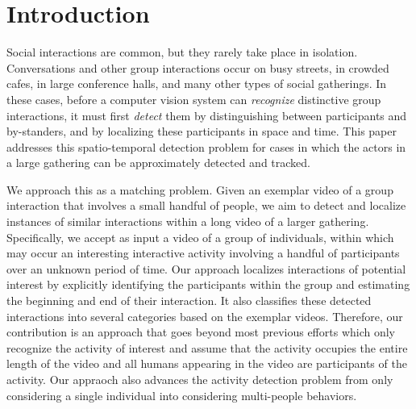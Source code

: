 \section{Introduction}

Social interactions are common, but they rarely take place in isolation. Conversations and other group interactions occur on busy streets, in crowded cafes, in large conference halls, and many other types of social gatherings. In these cases, before a computer vision system can \emph{recognize} distinctive group interactions, it must first \emph{detect} them by distinguishing between participants and by-standers, and by localizing these participants in space and time. This paper addresses this spatio-temporal detection problem for cases in which the actors in a large gathering can be approximately detected and tracked.

We approach this as a matching problem. Given an exemplar video of a group interaction that involves a small handful of people, we aim to detect and localize instances of similar interactions within a long video of a larger gathering. 
Specifically, we accept as input a video of a group of individuals, within which may occur an interesting interactive activity involving a handful of participants over an unknown period of time. Our approach localizes interactions of potential interest by explicitly identifying the participants within the group and estimating the beginning and end of their interaction. It also classifies these detected interactions into several categories based on the exemplar videos. Therefore, our  contribution is an approach that goes beyond most previous efforts \cite{Hongeng:act,Gong:act,Hakeem:act,McCowan:meeting,Ni:group,Choi:recogtrack,Intille:act,Vlad:group} which only recognize the activity of interest and assume that the activity occupies the entire length of the video and all humans appearing in the video are participants of the activity. Our appraoch also advances the activity detection problem from only considering a single individual \cite{Ke:detection,Yuan:detection,Shechtman:detection,Hu:detection,Laptev:detection,Duchenne:detection} into considering multi-people behaviors.

